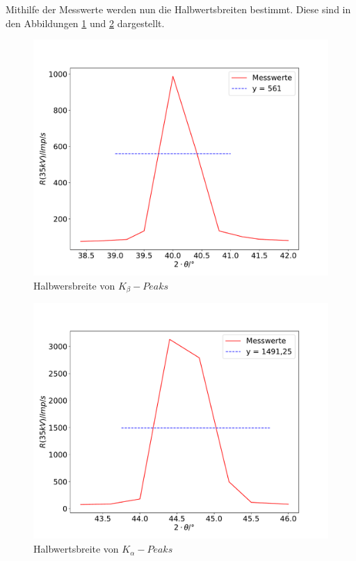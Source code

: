 Mithilfe der Messwerte werden nun die Halbwertsbreiten bestimmt.
Diese sind in den Abbildungen \ref{fig:h1} und \ref{fig:h2} dargestellt.
\begin{figure}[H]
  \centering
  \includegraphics[width=\textwidth]{halbwerts1.pdf}
  \caption{Halbwersbreite von $K_{\beta}-Peaks$}
  \label{fig:h1}
\end{figure}
\begin{figure}[H]
  \centering
  \includegraphics[width=\textwidth]{halbwerts2.pdf}
  \caption{Halbwertsbreite von $K_{\alpha}-Peaks$}
  \label{fig:h2}
\end{figure}
